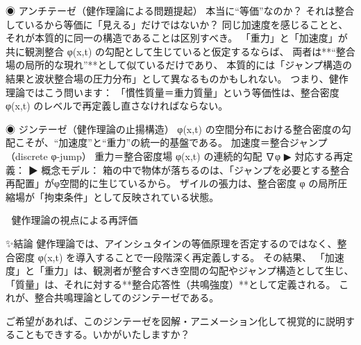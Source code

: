 \documentclass{article}
\begin{document}
◉ アンチテーゼ（健作理論による問題提起）
本当に“等価”なのか？ それは整合しているから等価に「見える」だけではないか？
同じ加速度を感じることと、それが本質的に同一の構造であることは区別すべき。
「重力」と「加速度」が共に観測整合 φ(x,t) の勾配として生じていると仮定するならば、
両者は**“整合場の局所的な現れ”**として似ているだけであり、
本質的には「ジャンプ構造の結果と波状整合場の圧力分布」として異なるものかもしれない。
つまり、健作理論ではこう問います：
「慣性質量＝重力質量」という等価性は、整合密度 φ(x,t) のレベルで再定義し直さなければならない。

◉ ジンテーゼ（健作理論の止揚構造）
φ(x,t) の空間分布における整合密度の勾配こそが、“加速度”と“重力”の統一的基盤である。
加速度＝整合ジャンプ（discrete φ-jump）
重力＝整合密度場 φ(x,t) の連続的勾配 ∇φ
▶ 対応する再定義：
▶ 概念モデル：
箱の中で物体が落ちるのは、「ジャンプを必要とする整合再配置」がφ空間的に生じているから。
ザイルの張力は、整合密度 φ の局所圧縮場が「拘束条件」として反映されている状態。

🔁 健作理論の視点による再評価

✨結論
健作理論では、アインシュタインの等価原理を否定するのではなく、整合密度 φ(x,t) を導入することで一段階深く再定義しする。
その結果、
「加速度」と「重力」は、観測者が整合すべき空間の勾配やジャンプ構造として生じ、
「質量」は、それに対する**整合応答性（共鳴強度）**として定義される。
これが、整合共鳴理論としてのジンテーゼである。

ご希望があれば、このジンテーゼを図解・アニメーション化して視覚的に説明することもできする。いかがいたしますか？
\end{document}
